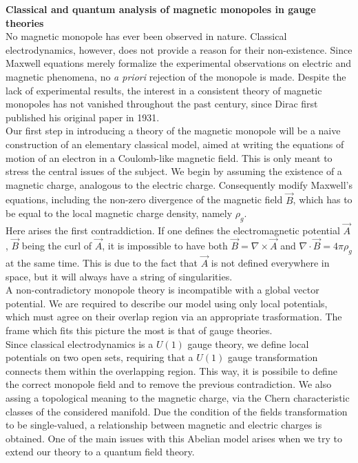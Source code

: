 
{\huge \textbf{Classical and quantum analysis of magnetic monopoles in gauge theories}}\\

No magnetic monopole has ever been observed in nature. Classical electrodynamics,
however, does not provide a reason for their non-existence. Since Maxwell equations
merely formalize the experimental observations on electric and magnetic phenomena,
no \emph{a priori} rejection of the monopole is made.
Despite the lack of experimental results, the interest in a consistent
theory of magnetic monopoles has not vanished throughout the past century, since
Dirac first published his original paper in 1931.\\

Our first step in introducing a theory of the magnetic monopole will be a naive
construction of an elementary classical model, aimed at writing the equations of motion
of an electron in a Coulomb-like magnetic field. This is only meant to stress the
central issues of the subject.
We begin by assuming the existence of a magnetic charge, analogous to the electric
charge. Consequently modify Maxwell's equations, including the non-zero
divergence of the magnetic field $\vec B$, which has to be equal to the local
magnetic charge density, namely $\rho_g$.\\
Here arises the first contraddiction. If one defines the electromagnetic potential
$\vec A$, $\vec B$ being the curl of $\vec A$, it is impossible to have both
$\vec B = \nabla \times \vec A$ and $\nabla \cdot \vec B = 4\pi \rho_g$ at the same
time. This is due to the fact that $\vec A$ is not defined everywhere in space, but
it will always have a string of singularities.\\

A non-contradictory monopole theory is incompatible with a global vector potential.
We are required to describe our model using only local potentials, which must
agree on their overlap region via an appropriate trasformation.
The frame which fits this picture the most is that of gauge theories.\\

Since classical electrodynamics is a $U(1)$ gauge theory, we define local potentials
on two open sets, requiring that a $U(1)$ gauge transformation connects them within the
overlapping region. This way, it is possibile to define the correct monopole field
and to remove the previous contradiction. We also assing a topological meaning
to the magnetic charge, via the Chern characteristic classes of the considered manifold.
Due the condition of the fields transformation to be single-valued,
a relationship between magnetic and electric charges is obtained.
One of the main issues with this Abelian model arises when we try to
extend our theory to a quantum field theory.\\

